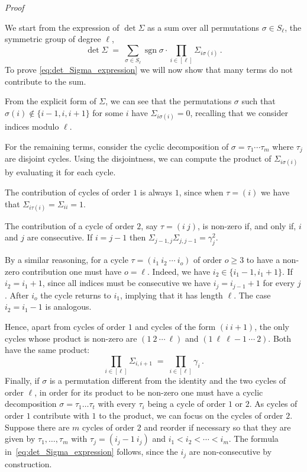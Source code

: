 \documentclass[reqno,a4paper,11pt]{amsart}
\makeatletter
\DeclareMathOperator{\sgn}{sgn}
\theoremstyle{remark}
\numberwithin{equation}{section}
\renewenvironment{proof}[1][Proof]{\par
\pushQED{\qed}%
\normalfont \topsep6\p@\@plus6\p@\relax
\trivlist
\item\relax
{\itshape
#1\@addpunct{.}}\hspace\labelsep\ignorespaces
}{%
\popQED\endtrivlist\@endpefalse
}
\makeatother
\begin{document}
\begin{proof}
We start from the expression of $\det \Sigma$ as a sum over all
permutations $\sigma \in S_\ell$, the symmetric group of degree $\ell$,
\begin{equation*}
\det \Sigma
    \;=\; \sum_{\sigma \in S_\ell} \sgn \sigma \cdot
        \prod_{i \in [\ell]} \Sigma_{i\sigma(i)}\,.
\end{equation*}
%
To prove \eqref{eq:det_Sigma_expression} we will now show that many terms do not contribute to the sum.

From the explicit form of $\Sigma$, we can see that the permutations $\sigma$ such that $\sigma(i) \notin \{i-1,i,i+1\}$ for some $i$ have $\Sigma_{i\sigma(i)} = 0$,
recalling that we consider indices modulo $\ell$.

For the remaining terms, consider the cyclic decomposition of $\sigma = \tau_1 \cdots \tau_m$ where $\tau_j$ are disjoint cycles. Using the disjointness, we can compute the
product of $\Sigma_{i\sigma(i)}$ by evaluating it for each cycle.

The contribution of cycles of order $1$ is always $1$, since when $\tau=(i)$ we have that $\Sigma_{i\tau(i)} = \Sigma_{ii} = 1$.

The contribution of a cycle of order $2$, say $\tau=(i\ j)$, is non-zero if, and only if, $i$ and $j$ are consecutive.  If $i=j-1$ then $\Sigma_{j-1,j} \Sigma_{j,j-1} = \gamma_j^2$.

By a similar reasoning, for a cycle $\tau = (i_1\ i_2\ \cdots\ i_o)$ of order
$o \ge 3$ to have a non-zero contribution one must have $o=\ell$. Indeed, we
have $i_2 \in \{i_1 - 1, i_1 + 1\}$. If $i_2 = i_1 + 1$, since all indices must
be consecutive we have $i_j = i_{j-1}+1$ for every $j$. After $i_o$ the cycle
returns to $i_1$, implying that it has length $\ell$. The case $i_2=i_1-1$ is
analogous.

Hence, apart from cycles of order $1$ and cycles of the form $(i\ i+1)$, the only
cycles whose product is non-zero are $(1\ 2\ \cdots\ \ell)$ and
$(1\ \ell\ \ell-1\ \cdots\ 2)$. Both have the same product:
\begin{equation*}
\prod_{i \in [\ell]} \Sigma_{i, i+1} \;=\; \prod_{i \in [\ell]} \gamma_i\,.
\end{equation*}
Finally, if $\sigma$ is a permutation different from the identity and the two
cycles of order $\ell$, in order for its product to be non-zero one must have a
cyclic decomposition $\sigma = \tau_1 \ldots \tau_t$ with every $\tau_i$ being
a cycle of order $1$ or $2$. As cycles of order $1$ contribute with $1$ to the
product, we can focus on the cycles of order $2$. Suppose there are $m$ cycles of
order $2$ and reorder if necessary so that they are given by $\tau_1, \ldots, \tau_m$
with $\tau_j = (i_j-1\ i_j)$ and $i_1 < i_2 < \cdots < i_m$. The formula
in~\eqref{eq:det_Sigma_expression} follows, since the $i_j$ are non-consecutive
by construction.
\end{proof}
\end{document}
